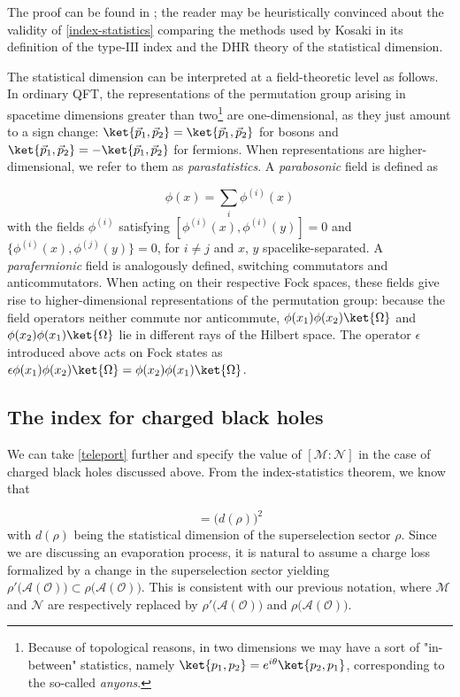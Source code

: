 \documentclass[a4paper,11pt]{article}
\begin{document}
The proof can be found in \cite{Longo}; the reader may be heuristically convinced about the validity of \ref{index-statistics} comparing the methods used by Kosaki in its definition of the type-$\mathrm{III}$ index and the DHR theory of the statistical dimension.

The statistical dimension can be interpreted at a field-theoretic level as follows. In ordinary QFT, the representations of the permutation group arising in spacetime dimensions greater than two\footnote{Because of topological reasons, in two dimensions we may have a sort of "in-between" statistics, namely $\ket{p_1, p_2} = e^{i \theta} \ket{p_2, p_1}$, corresponding to the so-called \textit{anyons}.} are one-dimensional, as they just amount to a sign change: $\ket{\vec{p}_1, \vec{p}_2} = \ket{\vec{p}_1, \vec{p}_2}$ for bosons and $\ket{\vec{p}_1, \vec{p}_2} = - \ket{\vec{p}_1, \vec{p}_2}$ for fermions. When representations are higher-dimensional, we refer to them as \textit{parastatistics}. A \textit{parabosonic} field is defined as \cite{Parastatistics}

\begin{equation}
    \phi (x) = \sum_{i} \phi^{(i)} (x)
    \label{par_field}
\end{equation}
%
with the fields $\phi^{(i)}$ satisfying $[\phi^{(i)}(x), \phi^{(i)}(y)] = 0$ and $\{\phi^{(i)}(x), \phi^{(j)}(y) \} = 0$, for $i \neq j$ and $x$, $y$ spacelike-separated. A \textit{parafermionic} field is analogously defined, switching commutators and anticommutators. When acting on their respective Fock spaces, these fields give rise to higher-dimensional representations of the permutation group: because the field operators neither commute nor anticommute, $\phi(x_1) \phi(x_2) \ket{\Omega}$ and $\phi(x_2) \phi(x_1) \ket{\Omega}$ lie in different rays of the Hilbert space. The operator $\epsilon$ introduced above acts on Fock states as $\epsilon \phi(x_1) \phi(x_2) \ket{\Omega} = \phi(x_2) \phi(x_1) \ket{\Omega}$.

\subsection{The index for charged black holes}

We can take \ref{teleport} further and specify the value of $[\mathcal{M}:\mathcal{N}]$ in the case of charged black holes discussed above. From the index-statistics theorem, we know that

\begin{equation}
    [\mathcal{A}(\mathcal{O}):\rho \big( \mathcal{A}(\mathcal{O}) \big)] = \big( d(\rho) \big)^2
\end{equation}
%
with $d(\rho)$ being the statistical dimension of the superselection sector $\rho$.
Since we are discussing an evaporation process, it is natural to assume a charge loss formalized by a change in the superselection sector yielding $\rho' \big( \mathcal{A}(\mathcal{O}) \big) \subset \rho \big( \mathcal{A}(\mathcal{O}) \big)$. This is consistent with our previous notation, where $\mathcal{M}$ and $\mathcal{N}$ are respectively replaced by $\rho' \big( \mathcal{A}(\mathcal{O}) \big)$ and $\rho \big( \mathcal{A}(\mathcal{O}) \big)$.
\end{document}
